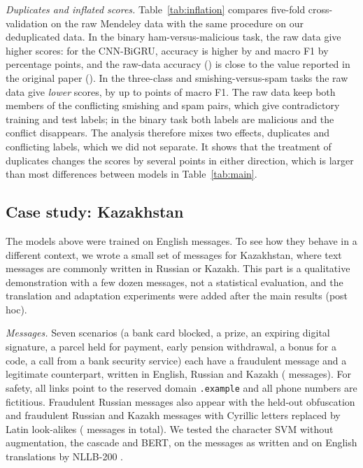 \emph{Duplicates and inflated scores.} Table~\ref{tab:inflation} compares five-fold cross-validation on the raw Mendeley data with the same procedure on our deduplicated data. In the binary ham-versus-malicious task, the raw data give higher scores: for the CNN-BiGRU, accuracy is higher by  and macro F1 by  percentage points, and the raw-data accuracy () is close to the value reported in the original paper (). In the three-class and smishing-versus-spam tasks the raw data give \emph{lower} scores, by up to  points of macro F1. The raw data keep both members of the conflicting smishing and spam pairs, which give contradictory training and test labels; in the binary task both labels are malicious and the conflict disappears. The analysis therefore mixes two effects, duplicates and conflicting labels, which we did not separate. It shows that the treatment of duplicates changes the scores by several points in either direction, which is larger than most differences between models in Table~\ref{tab:main}.

\subsection{Case study: Kazakhstan}\label{sec:kz}

The models above were trained on English messages. To see how they behave in a different context, we wrote a small set of messages for Kazakhstan, where text messages are commonly written in Russian or Kazakh. This part is a qualitative demonstration with a few dozen messages, not a statistical evaluation, and the translation and adaptation experiments were added after the main results (post hoc).

\emph{Messages.} Seven scenarios (a bank card blocked, a prize, an expiring digital signature, a parcel held for payment, early pension withdrawal, a bonus for a code, a call from a bank security service) each have a fraudulent message and a legitimate counterpart, written in English, Russian and Kazakh ( messages). For safety, all links point to the reserved domain \texttt{.example} and all phone numbers are fictitious. Fraudulent Russian messages also appear with the held-out obfuscation and fraudulent Russian and Kazakh messages with Cyrillic letters replaced by Latin look-alikes ( messages in total). We tested the character SVM without augmentation, the cascade and BERT, on the messages as written and on English translations by NLLB-200 \cite{nllb2024}.

